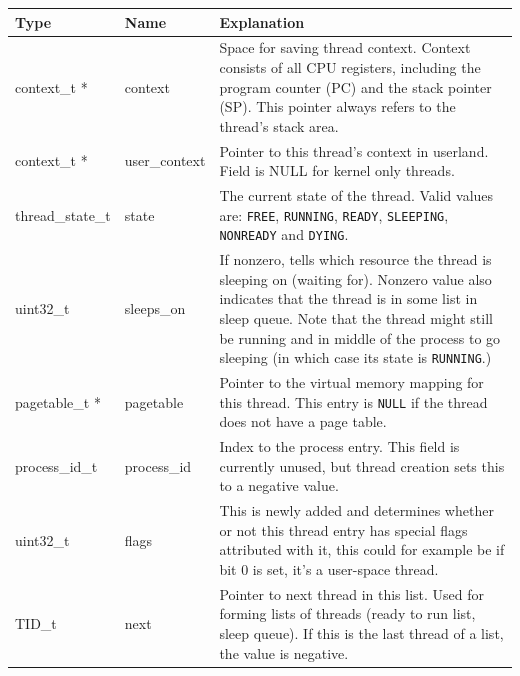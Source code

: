 \documentclass[twoside,a4paper]{report}
\newcommand{\PBS}[1]{\let\temp=\\#1\let\\=\temp}
\newlength{\tablewidth}
\begin{document}
\begin{table}
\begin{center}
\begin{tabularx}{\tablewidth}{l|l|>{\PBS\raggedright}X}
\textbf{Type}     & \textbf{Name}    & \textbf{Explanation} \\
\hline

context\_t * & context & Space for saving thread context. Context
consists of all CPU registers, including the program counter (PC) and
the stack pointer (SP). This pointer always refers to the thread's
stack area.\\

\hline

context\_t * & user\_context & Pointer to this thread's context in
userland. Field is NULL for kernel only threads. \\

\hline

thread\_state\_t & state & The current state of the thread. Valid
values are: \texttt{FREE}, \texttt{RUNNING}, \texttt{READY},
\texttt{SLEEPING}, \texttt{NONREADY} and \texttt{DYING}. \\

\hline

uint32\_t & sleeps\_on & If nonzero, tells which resource the
thread is sleeping on (waiting for). Nonzero value also indicates that
the thread is in some list in sleep queue. Note that the thread might
still be running and in middle of the process to go sleeping (in
which case its state is \texttt{RUNNING}.) \\

\hline

pagetable\_t * & pagetable & Pointer to the virtual memory mapping for
this thread. This entry is \texttt{NULL} if the thread does not have a
page table.\\

\hline

process\_id\_t & process\_id & Index to the process entry. This field
is currently unused, but thread creation sets this to a negative
value. \\

\hline

uint32\_t & flags & This is newly added and determines whether or 
not this thread entry has special flags attributed with it, this could
for example be if bit 0 is set, it's a user-space thread.  \\

\hline

TID\_t & next & Pointer to next thread in this list. Used for forming
lists of threads (ready to run list, sleep queue). If this is the last
thread of a list, the value is negative. \\


\end{tabularx}
\end{center}
\end{table}
\end{document}
